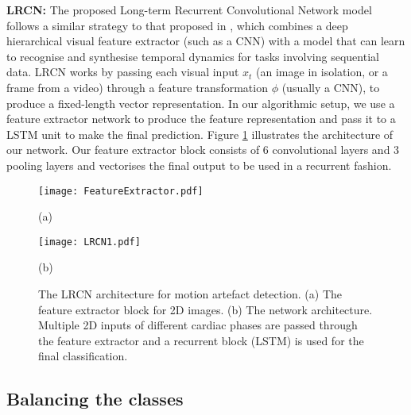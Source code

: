 \documentclass[preprint,12pt,authoryear]{elsarticle}
\begin{document}
\textbf{LRCN:} The proposed Long-term  Recurrent  Convolutional Network model follows a similar strategy to that proposed in \cite{Donahue2017}, which combines a deep hierarchical visual feature extractor (such as a CNN) with a model that can learn  to  recognise  and  synthesise  temporal  dynamics  for tasks involving sequential data. LRCN works by passing each  visual  input $x_{t}$ (an  image  in  isolation,  or  a  frame  from  a  video)  through a feature transformation $\phi$ (usually a CNN), to produce a fixed-length vector representation. In our algorithmic setup, we use a feature extractor network to produce the feature representation and pass it to a LSTM unit to make the final prediction. Figure \ref{fig:ModelLRCN}  illustrates the architecture of our network. Our feature extractor block consists of  6 convolutional layers and 3 pooling layers and vectorises the final output to be used in a recurrent fashion.



 \begin{figure}[tb]

\begin{minipage}[b]{0.48\linewidth}
  \centering
  \centerline{\texttt{[image: FeatureExtractor.pdf]}}
  \centerline{(a)}\medskip
\end{minipage}
\hfill
\begin{minipage}[b]{0.48\linewidth}
  \centering
  \centerline{\texttt{[image: LRCN1.pdf]}}
  \centerline{(b)}\medskip
\end{minipage}
%
\hfill


\caption{ The LRCN architecture for motion artefact detection. (a) The  feature extractor block for 2D images. (b) The network architecture. Multiple 2D inputs of different cardiac phases are passed through the feature extractor and a recurrent block (LSTM) is used for the final classification.}
\label{fig:ModelLRCN}
%
\end{figure}


\subsection{Balancing the classes}
\label{sec:balance}
\end{document}
